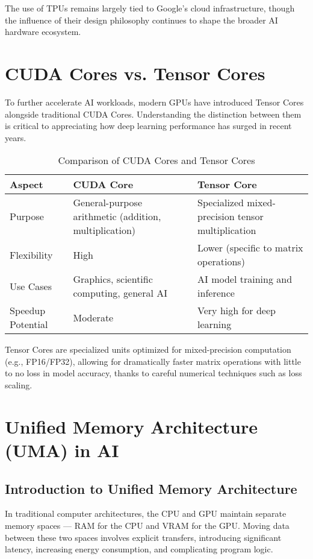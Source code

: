 \documentclass[openany]{book}
\begin{document}
The use of TPUs remains largely tied to Google's cloud infrastructure, though 
the influence of their design philosophy continues to shape the broader AI 
hardware ecosystem.

\section{CUDA Cores vs. Tensor Cores}

To further accelerate AI workloads, modern GPUs have introduced Tensor Cores 
alongside traditional CUDA Cores. Understanding the distinction between them is 
critical to appreciating how deep learning performance has surged in recent 
years.

\begin{table}[h]
\centering
\begin{tabular}{|l|l|l|}
\hline
\textbf{Aspect} & \textbf{CUDA Core} & \textbf{Tensor Core} \\ \hline
Purpose & General-purpose arithmetic (addition, multiplication) & Specialized 
mixed-precision tensor multiplication \\ \hline
Flexibility & High & Lower (specific to matrix operations) \\ \hline
Use Cases & Graphics, scientific computing, general AI & AI model training and 
inference \\ \hline
Speedup Potential & Moderate & Very high for deep learning \\ \hline
\end{tabular}
\caption{Comparison of CUDA Cores and Tensor Cores}
\end{table}

Tensor Cores are specialized units optimized for mixed-precision computation 
(e.g., FP16/FP32), allowing for dramatically faster matrix operations with 
little to no loss in model accuracy, thanks to careful numerical techniques such 
as loss scaling.

\section{Unified Memory Architecture (UMA) in AI}

\subsection{Introduction to Unified Memory Architecture}
In traditional computer architectures, the CPU and GPU maintain separate memory 
spaces — RAM for the CPU and VRAM for the GPU. Moving data between these two 
spaces involves explicit transfers, introducing significant latency, increasing 
energy consumption, and complicating program logic.
\end{document}
